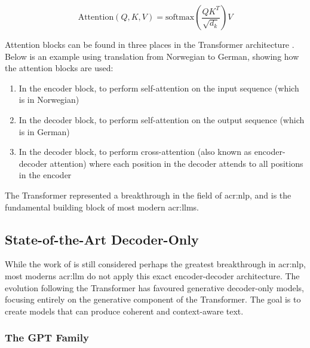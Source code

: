 \begin{equation}
    \text{Attention}(Q, K, V) = \text{softmax}\left(\frac{QK^T}{\sqrt{d_k}}\right)V
    \label{eq:attention}
\end{equation}

Attention blocks can be found in three places in the Transformer architecture \citep[5]{vaswaniAttentionAllYou2017}. Below is an example using translation from Norwegian to German, showing how the attention blocks are used:

\begin{enumerate}
    \item In the encoder block, to perform self-attention on the input sequence (which is in Norwegian)
    \item In the decoder block, to perform self-attention on the output sequence (which is in German)
    \item In the decoder block, to perform cross-attention (also known as encoder-decoder attention) where each position in the decoder attends to all positions in the encoder
\end{enumerate}

The Transformer represented a breakthrough in the field of \gls{acr:nlp}, and is the fundamental building block of most modern \glspl{acr:llm}.


\subsection[State-of-the-Art Decoder-Only Models]{State-of-the-Art Decoder-Only }
\label{subsec:sota-decoder-only-llms}

While the work of \citeauthor{vaswaniAttentionAllYou2017} is still considered perhaps the greatest breakthrough in \gls{acr:nlp}, most moderns \acrshort{acr:llm} do not apply this exact encoder-decoder architecture. The evolution following the Transformer has favoured generative decoder-only models, focusing entirely on the generative component of the Transformer. The goal is to create models that can produce coherent and context-aware text.

\subsubsection{The GPT Family}
\label{subusubsec:gpt}


